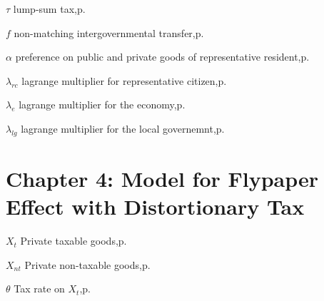 \begin{eqlist}
    \item[$\tau$]
    lump-sum tax,\hfill p.~\pageref{y}

    \item[$f$]
    non-matching intergovernmental transfer,\hfill p.~\pageref{f}

    \item[$\alpha$]
    preference on public and private goods of representative resident,\hfill p.~\pageref{bmrcutility}

    \item[$\lambda_{rc}$]
    lagrange multiplier for representative citizen,\hfill p.~\pageref{bmrclagrangian}

    \item[$\lambda_{e}$]
    lagrange multiplier for the economy,\hfill p.~\pageref{bmeclagrangian}

    \item[$\lambda_{lg}$]
    lagrange multiplier for the local governemnt,\hfill p.~\pageref{bmeclagrangian}



    \section*{ Chapter 4: Model for Flypaper Effect with Distortionary Tax}
    \item[$X_{t}$]
    Private taxable goods,\hfill p.~\pageref{Xt}

    \item[$X_{nt}$]
    Private non-taxable goods,\hfill p.~\pageref{Xt}

    \item[$\theta$]
    Tax rate on $X_t$,\hfill p.~\pageref{Xt}





\end{eqlist}
